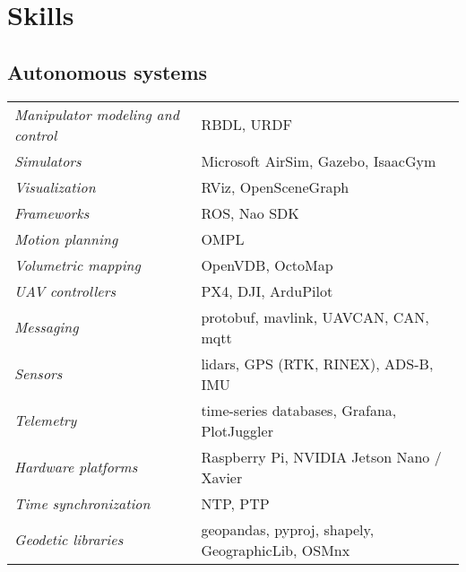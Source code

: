 \documentclass[a4paper,10pt]{report}
\begin{document}
\vspace{0.15cm}
\section{Skills}
\begin{adjustwidth}{0.5cm}{0pt}
%
\subsection{Autonomous systems}
\begin{adjustwidth}{0.5cm}{0pt}
    \begin{tabularx}{\linewidth}{l X}
        {\it Manipulator modeling and control}  & RBDL, URDF \\
        {\it Simulators}                        & Microsoft AirSim, Gazebo, IsaacGym \\
        {\it Visualization}                     & RViz, OpenSceneGraph \\
        {\it Frameworks}                        & ROS, Nao SDK \\
        {\it Motion planning}                   & OMPL \\
        {\it Volumetric mapping}                & OpenVDB, OctoMap \\
        {\it UAV controllers}                   & PX4, DJI, ArduPilot \\
        {\it Messaging}                         & protobuf, mavlink, UAVCAN, CAN, mqtt \\
        {\it Sensors}                           & lidars, GPS (RTK, RINEX), ADS-B, IMU \\
        {\it Telemetry}                         & time-series databases, Grafana, PlotJuggler \\
        {\it Hardware platforms}                & Raspberry Pi, NVIDIA Jetson Nano / Xavier\\
        {\it Time synchronization}              & NTP, PTP \\
        {\it Geodetic libraries}                & geopandas, pyproj, shapely, GeographicLib, OSMnx \\
    \end{tabularx}
\end{adjustwidth}


\end{adjustwidth}
\end{document}
